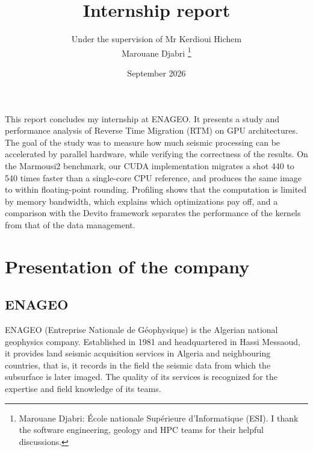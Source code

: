 \documentclass[letterpaper,11pt,leqno]{article}
\begin{document}
\title{Internship report}

\author{Under the supervision of Mr Kerdioui Hichem\\[8pt]
Marouane Djabri
%
\thanks{Marouane Djabri: \'Ecole nationale Sup\'erieure d'Informatique (ESI). I thank the software engineering, geology and HPC teams for their helpful discussions.}}

\date{September 2026}


\begin{titlepage}
\maketitle

This report concludes my internship at ENAGEO. It presents a study and performance analysis of Reverse Time Migration (RTM) on GPU architectures. The goal of the study was to measure how much seismic processing can be accelerated by parallel hardware, while verifying the correctness of the results. On the Marmousi2 benchmark, our CUDA implementation migrates a shot 440 to 540 times faster than a single-core CPU reference, and produces the same image to within floating-point rounding. Profiling shows that the computation is limited by memory bandwidth, which explains which optimizations pay off, and a comparison with the Devito framework separates the performance of the kernels from that of the data management.
\end{titlepage}
\section{Presentation of the company}\label{s:company}

\subsection{ENAGEO}
ENAGEO (Entreprise Nationale de G\'eophysique) is the Algerian national
geophysics company. Established in 1981 and headquartered in Hassi Messaoud, it
provides land seismic acquisition services in Algeria and neighbouring countries,
that is, it records in the field the seismic data from which the subsurface is
later imaged. The quality of its services is recognized for the expertise and
field knowledge of its teams.
\end{document}
